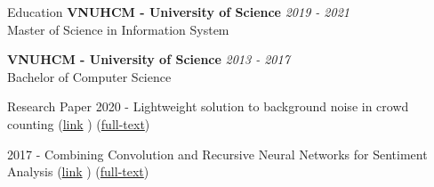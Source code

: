 \documentclass{resume} %
\begin{document}
\begin{rSection}{Education}
{\bf VNUHCM - University of Science} \hfill {\em 2019 - 2021 } 
\\ Master of Science in Information System  %

{\bf VNUHCM - University of Science} \hfill {\em 2013 - 2017 } 
\\ Bachelor of Computer Science  %
\end{rSection}
\begin{rSection}{Research Paper}
2020 - Lightweight solution to background noise in crowd counting 
(\href{https://ieeexplore.ieee.org/document/9335834}{link}  )
(\href{https://github.com/ttpro1995/NICS2020_paper/releases/tag/v1}{full-text})

2017 - Combining Convolution and Recursive Neural Networks for Sentiment Analysis (\href{https://dl.acm.org/doi/abs/10.1145/3155133.3155158}{link}  )
(\href{https://github.com/ttpro1995/soICT2017/releases/tag/v1.1}{full-text})
\end{rSection}
\end{document}
